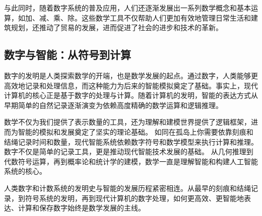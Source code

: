 
与此同时，随着数字系统的普及应用，人们还逐渐发展出一系列数学概念和基本运算，如加、减、乘、除。这些数学工具不仅帮助人们更加有效地管理日常生活和建筑规划，还推动了贸易的发展，进而促进了社会的进步和技术的革新。

\subsection{数字与智能：从符号到计算}

数字的发明是人类探索数学的开端，也是数学发展的起点。通过数字，人类能够更高效地记录和处理信息，而这种能力为后来的智能模拟奠定了基础。事实上，现代计算机的核心正是基于数字的处理与计算。随着计算机的发明，智能的表达方式从早期简单的自然记录逐渐演变为依赖高度精确的数学运算和逻辑推理。

数学不仅为我们提供了表示数量的工具，还为理解和建模世界提供了逻辑框架，进而为智能的模拟和发展奠定了坚实的理论基础。
如同在孤岛上你需要依靠刻痕和结绳记录时间和数量，现代智能系统依赖数字符号和数学模型来执行计算和推理。数字不仅是简单的记录工具，更是推动现代智能技术发展的基础。
从几何推理到代数符号运算，再到概率论和统计学的建模，数学一直是理解智能和构建人工智能系统的核心。

人类数字和计数系统的发明史与智能的发展历程紧密相连。从最早的刻痕和结绳记录，到符号系统的发明，再到现代计算机的数字处理，如何更高效、更智能地表达、计算和保存数字始终是数学发展的主线。 
